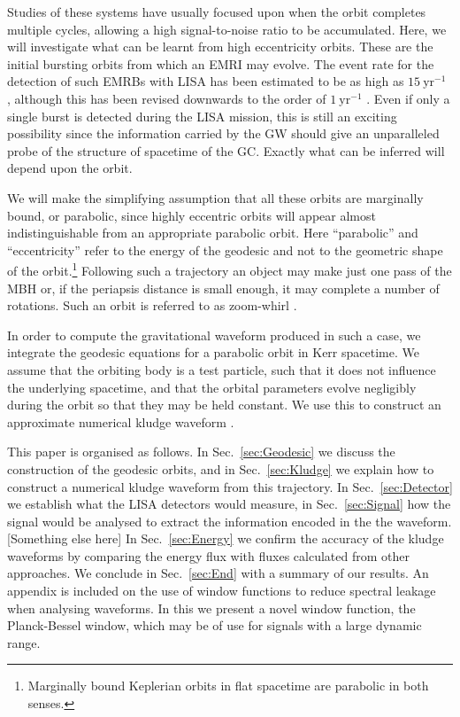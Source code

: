\documentclass[useAMS,usedcolumn,usegraphicx,usenatbib]{mn2e}
\newcommand{\secref}[1]{Sec.~\ref{sec:#1}}
\newcommand{\units}[1]{\ensuremath{~\mathrm{#1}}}
\begin{document}
Studies of these systems have usually focused upon when the orbit completes multiple cycles, allowing a high signal-to-noise ratio to be accumulated. Here, we will investigate what can be learnt from high eccentricity orbits. These are the initial bursting orbits from which an EMRI may evolve. The event rate for the detection of such EMRBs with LISA has been estimated to be as high as $15\units{yr^{-1}}$ \citep*{Rubbo2006}, although this has been revised downwards to the order of $1\units{yr^{-1}}$ \citep*{Hopman2007}. Even if only a single burst is detected during the LISA mission, this is still an exciting possibility since the information carried by the GW should give an unparalleled probe of the structure of spacetime of the GC. Exactly what can be inferred will depend upon the orbit.

We will make the simplifying assumption that all these orbits are marginally bound, or parabolic, since highly eccentric orbits will appear almost indistinguishable from an appropriate parabolic orbit. Here ``parabolic'' and ``eccentricity'' refer to the energy of the geodesic and not to the geometric shape of the orbit.\footnote{Marginally bound Keplerian orbits in flat spacetime are parabolic in both senses.} Following such a trajectory an object may make just one pass of the MBH or, if the periapsis distance is small enough, it may complete a number of rotations. Such an orbit is referred to as zoom-whirl \citep{Glampedakis2002a}.

In order to compute the gravitational waveform produced in such a case, we integrate the geodesic equations for a parabolic orbit in Kerr spacetime. We assume that the orbiting body is a test particle, such that it does not influence the underlying spacetime, and that the orbital parameters evolve negligibly during the orbit so that they may be held constant. We use this to construct an approximate numerical kludge waveform \citep{Babak2007}.

This paper is organised as follows. In \secref{Geodesic} we discuss the construction of the geodesic orbits, and in \secref{Kludge} we explain how to construct a numerical kludge waveform from this trajectory. In \secref{Detector} we establish what the LISA detectors would measure, in \secref{Signal} how the signal would be analysed to extract the information encoded in the the waveform. [Something else here] In \secref{Energy} we confirm the accuracy of the kludge waveforms by comparing the energy flux with fluxes calculated from other approaches. We conclude in \secref{End} with a summary of our results. An appendix is included on the use of window functions to reduce spectral leakage when analysing waveforms. In this we present a novel window function, the Planck-Bessel window, which may be of use for signals with a large dynamic range.
\end{document}
